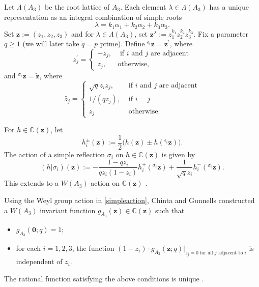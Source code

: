 \documentclass[12pt,reqno]{amsart}
\theoremstyle{plain}
\theoremstyle{remark}
\numberwithin{equation}{section}
\numberwithin{lemma}{section}
\numberwithin{theorem}{section}
\numberwithin{prop}{section}
\numberwithin{remark}{section}
\begin{document}
Let $\Lambda(A_3)$ be the root lattice of $A_3$. Each element $\lambda \in \Lambda(A_3)$
has a unique representation as an integral combination of simple roots 
\begin{equation}
\lambda=k_1 \alpha_1+k_2 \alpha_2+k_3 \alpha_3.
\end{equation}
Set $\boldsymbol{z}:=(z_1,z_2,z_3)$ and for $\lambda \in \Lambda(A_3)$,
set $\boldsymbol{z}^{\lambda}:=z_1^{k_1} z_2^{k_2} z_3^{k_3}$. 
Fix a parameter $q \geq 1$ (we will later take $q=p$ prime).
Define  
${}^{\epsilon_i} \boldsymbol{z}=\boldsymbol{z}^{\prime}$, where 
\begin{equation*}
z_j^{\prime}=\begin{cases}
-z_{j}, & \text{ if } i \text{ and } j \text{ are adjacent} \\
z_{j}, & \text{otherwise},
\end{cases}
\end{equation*}
and ${}^{\sigma_i} \boldsymbol{z}=\widetilde{\boldsymbol{z}}$,
where
\begin{equation*}
\widetilde{z_j}=\begin{cases}
\sqrt{q} z_i z_j, & \text{ if } i \text{ and } j \text{ are adjacent} \\
1/(qz_j), & \text{ if } i=j  \\
z_j & \text{ otherwise}.
\end{cases}
\end{equation*}

For $h \in \mathbb{C}(\boldsymbol{z})$,
let 
\begin{equation} \label{plusminus}
h_i^{\pm}(\boldsymbol{z}):=\frac{1}{2} \big( h(\boldsymbol{z}) \pm h({}^{\epsilon_i} \boldsymbol{z}) \big).
\end{equation}
The action of a simple reflection $\sigma_i$ on $h \in \mathbb{C}(\boldsymbol{z})$ is given by  
\begin{equation} \label{simpleaction}
(h \lvert \sigma_i)(\boldsymbol{z}):=-\frac{1-qz_i}{qz_i(1-z_i)} h_i^{+}({}^{\sigma_i} \boldsymbol{z})+
\frac{1}{\sqrt{q} z_i } h_i^{-}({}^{\sigma_i} \boldsymbol{z}).
\end{equation}
This extends to a $W(A_3)$-action on $\mathbb{C}(\boldsymbol{z})$ \cite[Lemma~3.2]{CG1}.

Using the Weyl group action in \eqref{simpleaction}, Chinta and Gunnells \cite{CG1,CG2} constructed
a $W(A_3)$ invariant function 
$g_{A_3}(\boldsymbol{z}) \in \mathbb{C}(\boldsymbol{z})$ such that
\begin{itemize}
\item $g_{A_3}(\boldsymbol{0};q)=1$;
\item for each $i=1,2,3$, the function $(1-z_i) \cdot g_{A_3}(\boldsymbol{z};q) \lvert_{z_j=0 \text{ for all } j \text{ adjacent to } i}$
is independent of $z_i$.
\end{itemize}
The rational function satisfying the above conditions is unique \cite{W2,W1}. 
\end{document}
